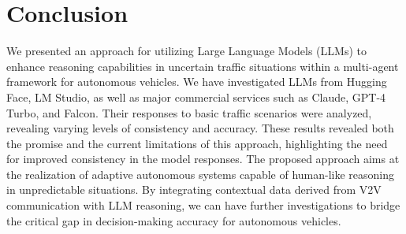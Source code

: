 \documentclass[conference]{IEEEtran}
\begin{document}
\section{Conclusion}
We presented an approach for utilizing Large Language Models (LLMs) to enhance reasoning capabilities in uncertain traffic situations within a multi-agent framework for autonomous vehicles. We have investigated LLMs from Hugging Face, LM Studio, as well as major commercial services such as Claude, GPT-4 Turbo, and Falcon. Their responses to basic traffic scenarios were analyzed, revealing varying levels of consistency and accuracy. These results revealed both the promise and the current limitations of this approach, highlighting the need for improved consistency in the model responses. The proposed approach aims at the realization of adaptive autonomous systems capable of human-like reasoning in unpredictable situations. By integrating contextual data derived from V2V communication with LLM reasoning, we can have further investigations to bridge the critical gap in decision-making accuracy for autonomous vehicles.


\end{document}

